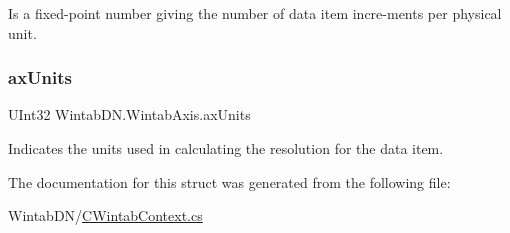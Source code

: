 Is a fixed-\/point number giving the number of data item incre-\/ments per physical unit. 

\mbox{\label{struct_wintab_d_n_1_1_wintab_axis_a571eed7c1e0ceb7cb44b1da7b2eaca69}} 
\subsubsection{\texorpdfstring{ax\+Units}{axUnits}}
{\footnotesize\ttfamily U\+Int32 Wintab\+D\+N.\+Wintab\+Axis.\+ax\+Units}



Indicates the units used in calculating the resolution for the data item. 



The documentation for this struct was generated from the following file\+:\begin{DoxyCompactItemize}
\item 
Wintab\+D\+N/\mbox{\hyperlink{_c_wintab_context_8cs}{C\+Wintab\+Context.\+cs}}\end{DoxyCompactItemize}
